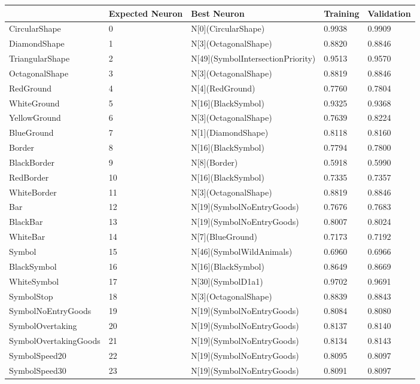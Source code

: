 \begin{tabular}{lllll}
\toprule
 & Expected Neuron & Best Neuron & Training & Validation \\
\midrule
CircularShape & 0 & N[0](CircularShape) & 0.9938 & 0.9909 \\
DiamondShape & 1 & N[3](OctagonalShape) & 0.8820 & 0.8846 \\
TriangularShape & 2 & N[49](SymbolIntersectionPriority) & 0.9513 & 0.9570 \\
OctagonalShape & 3 & N[3](OctagonalShape) & 0.8819 & 0.8846 \\
RedGround & 4 & N[4](RedGround) & 0.7760 & 0.7804 \\
WhiteGround & 5 & N[16](BlackSymbol) & 0.9325 & 0.9368 \\
YellowGround & 6 & N[3](OctagonalShape) & 0.7639 & 0.8224 \\
BlueGround & 7 & N[1](DiamondShape) & 0.8118 & 0.8160 \\
Border & 8 & N[16](BlackSymbol) & 0.7794 & 0.7800 \\
BlackBorder & 9 & N[8](Border) & 0.5918 & 0.5990 \\
RedBorder & 10 & N[16](BlackSymbol) & 0.7335 & 0.7357 \\
WhiteBorder & 11 & N[3](OctagonalShape) & 0.8819 & 0.8846 \\
Bar & 12 & N[19](SymbolNoEntryGoods) & 0.7676 & 0.7683 \\
BlackBar & 13 & N[19](SymbolNoEntryGoods) & 0.8007 & 0.8024 \\
WhiteBar & 14 & N[7](BlueGround) & 0.7173 & 0.7192 \\
Symbol & 15 & N[46](SymbolWildAnimals) & 0.6960 & 0.6966 \\
BlackSymbol & 16 & N[16](BlackSymbol) & 0.8649 & 0.8669 \\
WhiteSymbol & 17 & N[30](SymbolD1a1) & 0.9702 & 0.9691 \\
SymbolStop & 18 & N[3](OctagonalShape) & 0.8839 & 0.8843 \\
SymbolNoEntryGoods & 19 & N[19](SymbolNoEntryGoods) & 0.8084 & 0.8080 \\
SymbolOvertaking & 20 & N[19](SymbolNoEntryGoods) & 0.8137 & 0.8140 \\
SymbolOvertakingGoods & 21 & N[19](SymbolNoEntryGoods) & 0.8134 & 0.8143 \\
SymbolSpeed20 & 22 & N[19](SymbolNoEntryGoods) & 0.8095 & 0.8097 \\
SymbolSpeed30 & 23 & N[19](SymbolNoEntryGoods) & 0.8091 & 0.8097 \\

\end{tabular}
